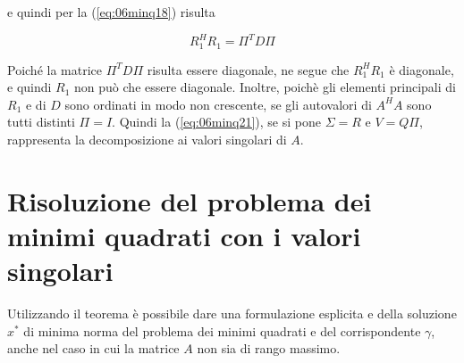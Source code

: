 e quindi per la  (\ref{eq:06minq18}) risulta

$$R_1^{H} R_1 = \Pi^T D\Pi$$

Poich\'e la matrice $\Pi^T D\Pi$ risulta essere diagonale, ne segue che $R_1^{H} R_1$ 
\`e  diagonale, e quindi $R_1$ non pu\`o che essere diagonale.
 Inoltre, poich\`e gli  
 elementi principali di $R_1$ e di $D$ sono ordinati in modo non 
crescente, se gli  autovalori di $A^H A$ sono tutti distinti 
$ \Pi = I$. Quindi la (\ref{eq:06minq21}), se si pone
$ \Sigma = R$ e $V = Q\Pi$, rappresenta la decomposizione ai valori
 singolari di $A$.

\section{Risoluzione del problema dei minimi quadrati con i valori singolari}
Utilizzando il teorema \label{eq:06minq33} \`e possibile dare una
formulazione esplicita e della soluzione $x^*$ di minima norma del
problema dei minimi quadrati e del corrispondente $\gamma$, anche nel
caso in cui la matrice $A$ non sia di rango massimo.

